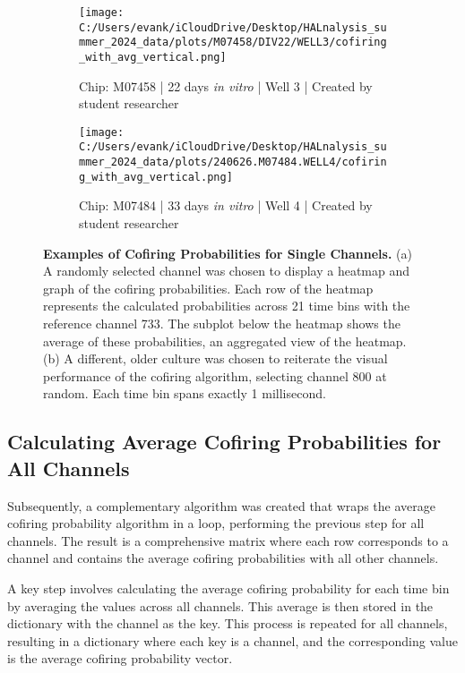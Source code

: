 \documentclass{article} %
\begin{document}
\begin{figure}
    \centering
    \begin{subfigure}[b]{0.48\textwidth}
        \centering
        \texttt{[image: C:/Users/evank/iCloudDrive/Desktop/HALnalysis\_summer\_2024\_data/plots/M07458/DIV22/WELL3/cofiring\_with\_avg\_vertical.png]}
        \caption{Chip: M07458 | 22 days \textit{in vitro} | Well 3 | Created by student researcher}
    \end{subfigure}
    \hspace{\fill}
    \begin{subfigure}[b]{0.48\textwidth}
        \centering
        \texttt{[image: C:/Users/evank/iCloudDrive/Desktop/HALnalysis\_summer\_2024\_data/plots/240626.M07484.WELL4/cofiring\_with\_avg\_vertical.png]}
        \caption{Chip: M07484 | 33 days \textit{in vitro} | Well 4 | Created by student researcher}
    \end{subfigure}
    \caption{\textbf{Examples of Cofiring Probabilities for Single Channels.} (a) A randomly selected channel was chosen to display a heatmap and graph of the cofiring probabilities. Each row of the heatmap represents the calculated probabilities across 21 time bins with the reference channel 733. The subplot below the heatmap shows the average of these probabilities, an aggregated view of the heatmap. (b) A different, older culture was chosen to reiterate the visual performance of the cofiring algorithm, selecting channel 800 at random. Each time bin spans exactly 1 millisecond.}
\end{figure}


\subsection{Calculating Average Cofiring Probabilities for All Channels}
Subsequently, a complementary algorithm was created that wraps the average cofiring probability algorithm in a loop, performing the previous step for all channels. The result is a comprehensive matrix where each row corresponds to a channel and contains the average cofiring probabilities with all other channels.

A key step involves calculating the average cofiring probability for each time bin by averaging the values across all channels. This average is then stored in the dictionary with the channel as the key. This process is repeated for all channels, resulting in a dictionary where each key is a channel, and the corresponding value is the average cofiring probability vector.
\end{document}
